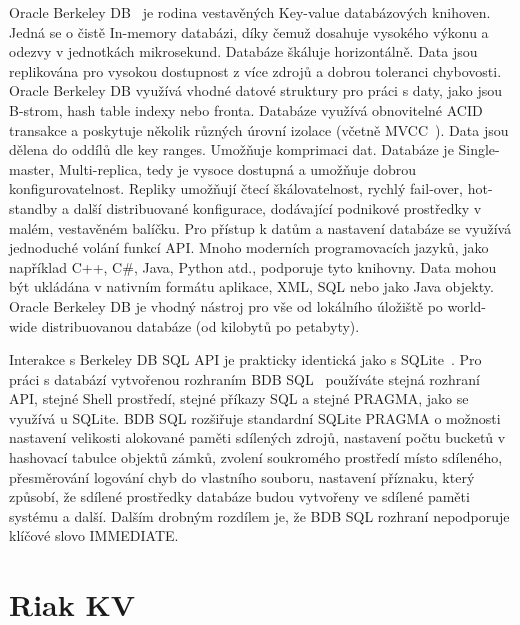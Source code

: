 \documentclass[czech,master,dept460,male,csharp,cpdeclaration]{diploma}
\begin{document}
	Oracle Berkeley DB~\cite{berkeleydb} je rodina vestavěných Key-value databázových knihoven. Jedná se o čistě In-memory databázi, díky čemuž dosahuje vysokého výkonu a odezvy v jednotkách mikrosekund. Databáze škáluje horizontálně. Data jsou replikována pro vysokou dostupnost z více zdrojů a dobrou toleranci chybovosti. Oracle Berkeley DB využívá vhodné datové struktury pro práci s daty, jako jsou B-strom, hash table indexy nebo fronta. Databáze využívá obnovitelné ACID transakce a poskytuje několik různých úrovní izolace (včetně MVCC~\cite{mvcc}). Data jsou dělena do oddílů dle key ranges. Umožňuje komprimaci dat. Databáze je Single-master, Multi-replica, tedy je vysoce dostupná a umožňuje dobrou konfigurovatelnost. Repliky umožňují čtecí škálovatelnost, rychlý fail-over, hot-standby a další distribuované konfigurace, dodávající podnikové prostředky v malém, vestavěném balíčku. Pro přístup k datům a nastavení databáze se využívá jednoduché volání funkcí API. Mnoho moderních programovacích jazyků, jako například C++, C\#, Java, Python atd., podporuje tyto knihovny. Data mohou být ukládána v nativním formátu aplikace, XML, SQL nebo jako Java objekty. Oracle Berkeley DB je vhodný nástroj pro vše od lokálního úložiště po world-wide distribuovanou databáze (od kilobytů po petabyty).
	
	Interakce s Berkeley DB SQL API je prakticky identická jako s SQLite~\cite{sqlite}. Pro práci s databází vytvořenou rozhraním BDB SQL~\cite{bdbsql} používáte stejná rozhraní API, stejné Shell prostředí, stejné příkazy SQL a stejné PRAGMA, jako se využívá u SQLite. BDB SQL rozšiřuje standardní SQLite PRAGMA o možnosti nastavení velikosti alokované paměti sdílených zdrojů, nastavení počtu bucketů v hashovací tabulce objektů zámků, zvolení soukromého prostředí místo sdíleného, přesměrování logování chyb do vlastního souboru, nastavení příznaku, který způsobí, že sdílené prostředky databáze budou vytvořeny ve sdílené paměti systému a další. Dalším drobným rozdílem je, že BDB SQL rozhraní nepodporuje klíčové slovo IMMEDIATE.
	
	\section{Riak KV} \label{lab-riak}
	
\end{document}
